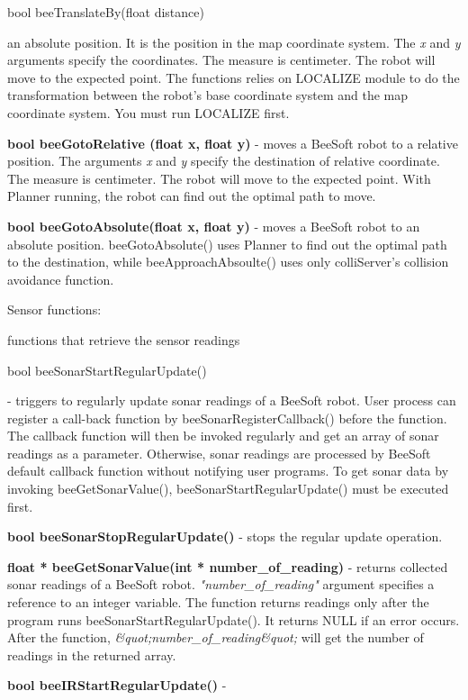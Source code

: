 {\begin{enumerate}{\bf \item bool
    beeTranslateBy(float distance)}
  an absolute position. It is the position in the map coordinate
  system. The {\it x} and {\it y} arguments specify the coordinates.
  The measure is centimeter. The robot will move to the expected
  point. The functions relies on LOCALIZE module to do the
  transformation between the robot's base coordinate system and the
  map coordinate system. You must run LOCALIZE first. \item {\bf bool
    beeGotoRelative (float x, float y)} - moves a BeeSoft robot to a
  relative position. The arguments {\it x} and {\it y} specify the
  destination of relative coordinate. The measure is centimeter. The
  robot will move to the expected point. With Planner running, the
  robot can find out the optimal path to move. \item {\bf bool
    beeGotoAbsolute(float x, float y)} - moves a BeeSoft robot to an
  absolute position. beeGotoAbsolute() uses Planner to find out the
  optimal path to the destination, while beeApproachAbsoulte() uses
  only colliServer's collision avoidance function.
\end{enumerate}{\bf \par Sensor functions: }functions that retrieve
the sensor readings\par \begin{enumerate}{\bf \item bool
    beeSonarStartRegularUpdate()} - triggers to regularly update sonar
  readings of a BeeSoft robot. User process can register a call-back
  function by beeSonarRegisterCallback() before the function. The
  callback function will then be invoked regularly and get an array of
  sonar readings as a parameter. Otherwise, sonar readings are
  processed by BeeSoft default callback function without notifying
  user programs. To get sonar data by invoking beeGetSonarValue(),
  beeSonarStartRegularUpdate() must be executed first.\item {\bf bool
    beeSonarStopRegularUpdate()} - stops the regular update operation.
\item {\bf float * beeGetSonarValue(int * number\_of\_reading)} -
  returns collected sonar readings of a BeeSoft robot. {\it
    "number\_of\_reading"} argument specifies a reference to an
  integer variable. The function returns readings only after the
  program runs beeSonarStartRegularUpdate(). It returns NULL if an
  error occurs. After the function, {\it
    \&quot;number\_of\_reading\&quot;} will get the number of readings
  in the returned array.\item {\bf bool beeIRStartRegularUpdate()} -

\end{enumerate}}
